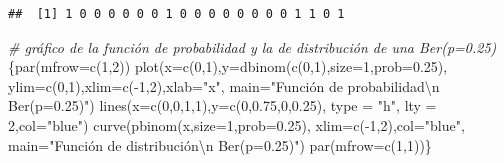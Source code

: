 \documentclass[
]{article}
\newenvironment{Shaded}{\begin{snugshade}}{\end{snugshade}}
\newcommand{\AttributeTok}[1]{\textcolor[rgb]{0.77,0.63,0.00}{#1}}
\newcommand{\CommentTok}[1]{\textcolor[rgb]{0.56,0.35,0.01}{\textit{#1}}}
\newcommand{\DecValTok}[1]{\textcolor[rgb]{0.00,0.00,0.81}{#1}}
\newcommand{\FloatTok}[1]{\textcolor[rgb]{0.00,0.00,0.81}{#1}}
\newcommand{\FunctionTok}[1]{\textcolor[rgb]{0.00,0.00,0.00}{#1}}
\newcommand{\NormalTok}[1]{#1}
\newcommand{\SpecialCharTok}[1]{\textcolor[rgb]{0.00,0.00,0.00}{#1}}
\newcommand{\StringTok}[1]{\textcolor[rgb]{0.31,0.60,0.02}{#1}}
\begin{document}
\begin{verbatim}
##  [1] 1 0 0 0 0 0 0 1 0 0 0 0 0 0 0 0 1 1 0 1
\end{verbatim}

\begin{Shaded}
\begin{Highlighting}[]
\CommentTok{\# gráfico de la función de probabilidad y la de distribución de una Ber(p=0.25)}
\NormalTok{\{}\FunctionTok{par}\NormalTok{(}\AttributeTok{mfrow=}\FunctionTok{c}\NormalTok{(}\DecValTok{1}\NormalTok{,}\DecValTok{2}\NormalTok{))}
\FunctionTok{plot}\NormalTok{(}\AttributeTok{x=}\FunctionTok{c}\NormalTok{(}\DecValTok{0}\NormalTok{,}\DecValTok{1}\NormalTok{),}\AttributeTok{y=}\FunctionTok{dbinom}\NormalTok{(}\FunctionTok{c}\NormalTok{(}\DecValTok{0}\NormalTok{,}\DecValTok{1}\NormalTok{),}\AttributeTok{size=}\DecValTok{1}\NormalTok{,}\AttributeTok{prob=}\FloatTok{0.25}\NormalTok{),}
     \AttributeTok{ylim=}\FunctionTok{c}\NormalTok{(}\DecValTok{0}\NormalTok{,}\DecValTok{1}\NormalTok{),}\AttributeTok{xlim=}\FunctionTok{c}\NormalTok{(}\SpecialCharTok{{-}}\DecValTok{1}\NormalTok{,}\DecValTok{2}\NormalTok{),}\AttributeTok{xlab=}\StringTok{"x"}\NormalTok{,}
     \AttributeTok{main=}\StringTok{"Función de probabilidad}\SpecialCharTok{\textbackslash{}n}\StringTok{ Ber(p=0.25)"}\NormalTok{)}
\FunctionTok{lines}\NormalTok{(}\AttributeTok{x=}\FunctionTok{c}\NormalTok{(}\DecValTok{0}\NormalTok{,}\DecValTok{0}\NormalTok{,}\DecValTok{1}\NormalTok{,}\DecValTok{1}\NormalTok{),}\AttributeTok{y=}\FunctionTok{c}\NormalTok{(}\DecValTok{0}\NormalTok{,}\FloatTok{0.75}\NormalTok{,}\DecValTok{0}\NormalTok{,}\FloatTok{0.25}\NormalTok{), }\AttributeTok{type =} \StringTok{"h"}\NormalTok{, }\AttributeTok{lty =} \DecValTok{2}\NormalTok{,}\AttributeTok{col=}\StringTok{"blue"}\NormalTok{)}
\FunctionTok{curve}\NormalTok{(}\FunctionTok{pbinom}\NormalTok{(x,}\AttributeTok{size=}\DecValTok{1}\NormalTok{,}\AttributeTok{prob=}\FloatTok{0.25}\NormalTok{),}
      \AttributeTok{xlim=}\FunctionTok{c}\NormalTok{(}\SpecialCharTok{{-}}\DecValTok{1}\NormalTok{,}\DecValTok{2}\NormalTok{),}\AttributeTok{col=}\StringTok{"blue"}\NormalTok{,}
      \AttributeTok{main=}\StringTok{"Función de distribución}\SpecialCharTok{\textbackslash{}n}\StringTok{ Ber(p=0.25)"}\NormalTok{)}
\FunctionTok{par}\NormalTok{(}\AttributeTok{mfrow=}\FunctionTok{c}\NormalTok{(}\DecValTok{1}\NormalTok{,}\DecValTok{1}\NormalTok{))\}}
\end{Highlighting}
\end{Shaded}
\end{document}
